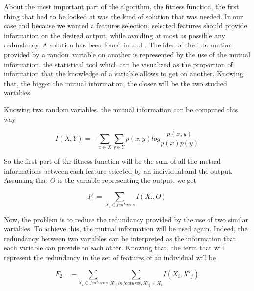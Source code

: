 \documentclass{report}
\begin{document}
	About the most important part of the algorithm, the fitness function, the first thing that had to be looked at was the kind of solution that was needed. In our case and because we wanted a features selection, selected features should provide information on the desired output, while avoiding at most as possible any redundancy. A solution has been found in \cite{huang2007hybrid} and \cite{chahkandifeature}. The idea of the information provided by a random variable on another is represented by the use of the mutual information, the statistical tool which can be visualized as the proportion of information that the knowledge of a variable allows to get on another. Knowing that, the bigger the mutual information, the closer will be the two studied variables.
	
	Knowing two random variables, the mutual information can be computed this way
	
	\vspace{0.3cm}
	\begin{equation}
	I(X,Y) =- \sum_{x\in X}^{}\sum_{y\in Y}^{} p(x,y)log\frac{p(x,y)}{p(x)p(y)}
	\end{equation}
	\vspace{0.3cm}
	
	So the first part of the fitness function will be the sum of all the mutual informations between each feature selected by an individual and the output. Assuming that $O$ is the variable representing the output, we get 
	
	\vspace{0.3cm}
	\begin{equation}
	F_1 = \sum_{X_i \in features} I(X_i,O)
	\end{equation}
	\vspace{0.3cm}
	
	Now, the problem is to reduce the redundancy provided by the use of two similar variables. To achieve this, the mutual information will be used again. Indeed, the redundancy between two variables can be interpreted as the information that each variable can provide to each other. Knowing that, the term that will represent the redundancy in the set of features of an individual will be
	
	\vspace{0.3cm}
	\begin{equation}
	F_2 = -\sum_{X_i \in features} \sum_{X'_j \ in features, X'_j \neq X_i} I(X_i,X'_j)
	\end{equation}
	\vspace{0.3cm}
	
\end{document}
